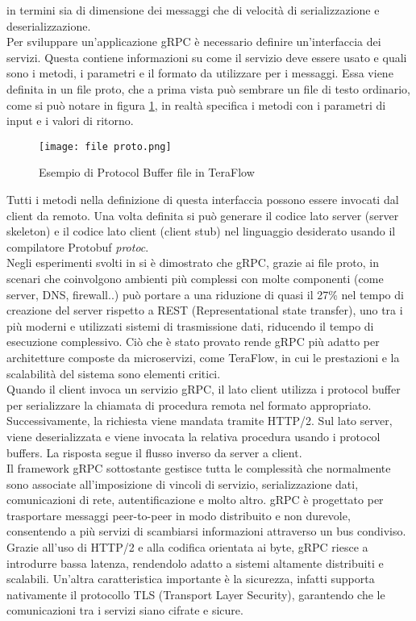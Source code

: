 in termini sia di dimensione dei messaggi che di velocità di serializzazione e deserializzazione.
\\Per sviluppare un'applicazione gRPC è necessario definire un'interfaccia dei servizi. Questa contiene informazioni su come il servizio deve essere usato e quali sono i metodi, i parametri e 
il formato da utilizzare per i messaggi. Essa viene definita in un file proto, che a prima vista può sembrare un file di testo ordinario, come si può notare in figura \ref{fig:proto}, in realtà specifica i metodi con i parametri di input e i valori di ritorno.
\begin{figure}[h]
    \centering
   \texttt{[image: file proto.png]}
    \caption{Esempio di Protocol Buffer file in TeraFlow \cite{ProtoBuf}}
    \label{fig:proto}
\end{figure}
Tutti i metodi nella definizione di questa interfaccia possono essere invocati dal client da remoto.
Una volta definita si può generare il codice lato server (server skeleton) e il codice lato client (client stub) nel linguaggio desiderato usando il compilatore Protobuf \textit{protoc}\cite{librogrpc}.
\\Negli esperimenti svolti in \cite{espgrpc} si è dimostrato che gRPC, grazie ai file proto, in scenari che coinvolgono ambienti più complessi con molte componenti (come server, DNS, firewall..)
può portare a una riduzione di quasi il 27\% nel tempo di creazione del server rispetto a REST (Representational state transfer), uno tra i più moderni e utilizzati sistemi di trasmissione dati, riducendo il tempo di esecuzione complessivo.
Ciò che è stato provato rende gRPC più adatto per architetture composte da microservizi, come TeraFlow, in cui le prestazioni e la scalabilità del sistema sono elementi critici.
\\Quando il client invoca un servizio gRPC, il lato client utilizza i protocol buffer per serializzare la chiamata di procedura remota nel formato appropriato. 
Successivamente, la richiesta viene mandata tramite HTTP/2. Sul lato server, viene deserializzata e viene invocata la relativa procedura usando i protocol buffers.
La risposta segue il flusso inverso da server a client\cite{librogrpc}.
\\Il framework gRPC sottostante gestisce tutta le complessità che normalmente sono associate all'imposizione di vincoli di servizio, serializzazione dati, comunicazioni di rete, autentificazione e molto altro.
gRPC è progettato per trasportare messaggi peer-to-peer in modo distribuito e non durevole, consentendo a più servizi di scambiarsi informazioni attraverso un bus condiviso.
Grazie all'uso di HTTP/2 e alla codifica orientata ai byte, gRPC riesce a introdurre bassa latenza, rendendolo adatto a sistemi altamente distribuiti e scalabili. 
Un'altra caratteristica importante è la sicurezza, infatti supporta nativamente il protocollo TLS (Transport Layer Security), garantendo che le comunicazioni tra i servizi siano cifrate e sicure.


